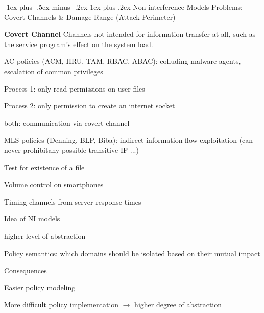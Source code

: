 \documentclass[a4paper]{article}
\makeatletter
\renewcommand{\note}[2]{\begin{noteBox} \textbf{#1} #2 \end{noteBox}}
\renewcommand{\subsubsection}{\@startsection{subsubsection}{3}{0mm}%
                {-1ex plus -.5ex minus -.2ex}%
                {1ex plus .2ex}%
                {\normalfont\small\bfseries}}
\makeatother
\begin{document}
\begin{multicols}{3}
    \subsubsection{Non-interference Models}
    Problems: Covert Channels \& Damage Range (Attack Perimeter)

    \note{Covert Channel}{Channels not intended for information transfer at all, such as the service program’s effect on the system load.}

    \begin{itemize*}
        \item AC policies (ACM, HRU, TAM, RBAC, ABAC): colluding malware agents, escalation of common privileges
        \begin{itemize*}
            \item Process 1: only read permissions on user files
            \item Process 2: only permission to create an internet socket
            \item both: communication via covert channel
        \end{itemize*}
        \item MLS policies (Denning, BLP, Biba): indirect information flow exploitation (can never prohibitany possible transitive IF ...)
        \begin{itemize*}
            \item Test for existence of a file
            \item Volume control on smartphones
            \item Timing channels from server response times
        \end{itemize*}
    \end{itemize*}

    Idea of NI models
    \begin{itemize*}
        \item higher level of abstraction
        \item Policy semantics: which domains should be isolated based on their mutual impact
    \end{itemize*}

    Consequences
    \begin{itemize*}
        \item Easier policy modeling
        \item More difficult policy implementation $\rightarrow$ higher degree of abstraction
    \end{itemize*}


\end{multicols}
\end{document}
